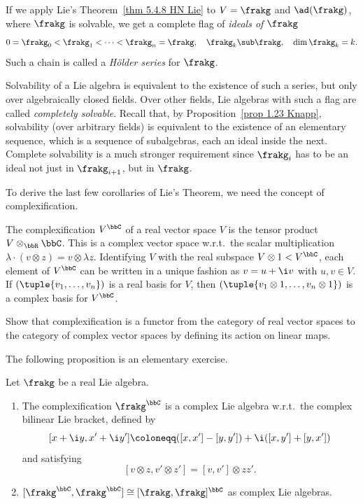 \begin{rem}
    If we apply Lie's Theorem~\ref{thm 5.4.8 HN Lie} to $V=\frakg$ and $\ad(\frakg)$, where $\frakg$ is solvable, we get a complete flag of \emph{ideals of $\frakg$} 
    \[0=\frakg_0< \frakg_1< \cdots< \frakg_n=\frakg,\quad \frakg_k\sub \frakg,\quad \dim \frakg_k=k.\]
    Such a chain is called a \emph{H\"older series} for $\frakg$.
    
    Solvability of a Lie algebra is equivalent to the existence of such a series, but only over algebraically closed fields. Over other fields, Lie algebras with such a flag are called \emph{completely solvable}. Recall that, by Proposition~\ref{prop 1.23 Knapp}, solvability (over arbitrary fields) is equivalent to the existence of an elementary sequence, which is a sequence of subalgebras, each an ideal inside the next. Complete solvability is a much stronger requirement since $\frakg_i$ has to be an ideal not just in $\frakg_{i+1}$, but in $\frakg$.
\end{rem}

To derive the last few corollaries of Lie's Theorem, we need the concept of complexification.

\begin{defn}[Complexification]
    The complexification $V^\bbC$ of a real vector space $V$ is the tensor product $V\otimes_\bbR \bbC$. This is a complex vector space w.r.t.\ the scalar multiplication $\lambda\cdot (v\otimes z)=v\otimes\lambda z$. Identifying $V$ with the real subspace $V\otimes 1<V^\bbC$, each element of $V^\bbC$ can be written in a unique fashion as $v=u+\i v$ with $u,v\in V$. If $(\tuple{v_1,\ldots,v_n})$ is a real basis for $V$, then $(\tuple{v_1\otimes 1,\ldots,v_n\otimes 1})$ is a complex basis for $V^\bbC$.
\end{defn}

\begin{xca}
    Show that complexification is a functor from the category of real vector spaces to the category of complex vector spaces by defining its action on linear maps.
\end{xca}

The following proposition is an elementary exercise.

\begin{prop}[{\cite[Prop.~5.1.21]{HN}}]\label{prop 5.1.21 HN}
    Let $\frakg$ be a real Lie algebra.
    \begin{enumerate}[label=(\roman*)]
        \item The complexification $\frakg^\bbC$ is a complex Lie algebra w.r.t.\ the complex bilinear Lie bracket, defined by 
        \[[x+\i y,x'+\i y']\coloneqq ([x,x']-[y,y'])+\i([x,y']+[y,x'])\]
        and satisfying 
        \[[v\otimes z,v'\otimes z']=[v,v']\otimes zz'.\]
        \item $[\frakg^\bbC,\frakg^\bbC]\cong [\frakg,\frakg]^\bbC$ as complex Lie algebras.
    \end{enumerate}
\end{prop}


